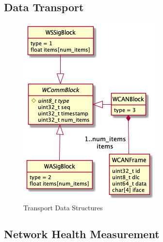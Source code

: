\documentclass[letterpaper,twocolumn,12pt]{article}
\begin{document}
\subsection{Data Transport}
\begin{figure}[t!]
    \centering
    \includegraphics[width=\linewidth]{out/images/data_structures/data_structures.png}
    \caption{Transport Data Structures}
    \label{fig:ds}
\end{figure}

\subsection{Network Health Measurement}
\end{document}
